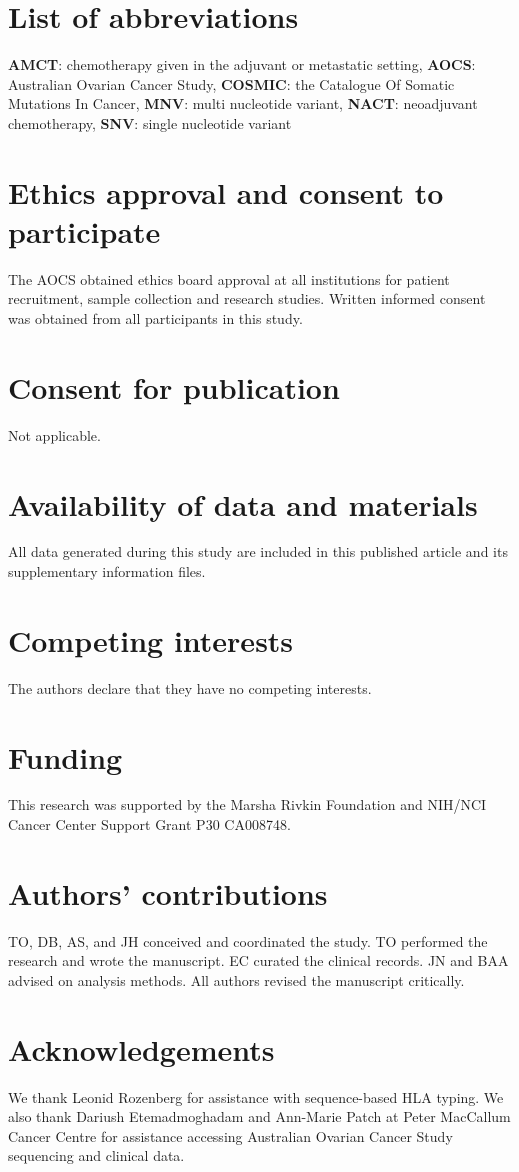 \section{List of abbreviations}
\textbf{AMCT}: chemotherapy given in the adjuvant or metastatic setting, \textbf{AOCS}: Australian Ovarian Cancer Study, \textbf{COSMIC}: the Catalogue Of Somatic Mutations In Cancer, \textbf{MNV}: multi nucleotide variant, \textbf{NACT}: neoadjuvant chemotherapy, \textbf{SNV}: single nucleotide variant

\section{Ethics approval and consent to participate}
The AOCS obtained ethics board approval at all institutions for patient recruitment, sample collection and research studies. Written informed consent was obtained from all participants in this study.

\section{Consent for publication}
Not applicable.

\section{Availability of data and materials}
All data generated during this study are included in this published article and its supplementary information files.

\section{Competing interests}
The authors declare that they have no competing interests.

\section{Funding}
This research was supported by the Marsha Rivkin Foundation and NIH/NCI Cancer Center Support Grant P30 CA008748.

\section{Authors' contributions}
TO, DB, AS, and JH conceived and coordinated the study. TO performed the research and wrote the manuscript. EC curated the clinical records. JN and BAA advised on analysis methods.  All authors revised the manuscript critically.

\section{Acknowledgements}
We thank Leonid Rozenberg for assistance with sequence-based HLA typing. We also thank Dariush Etemadmoghadam and Ann-Marie Patch at Peter MacCallum Cancer Centre for assistance accessing Australian Ovarian Cancer Study sequencing and clinical data.
